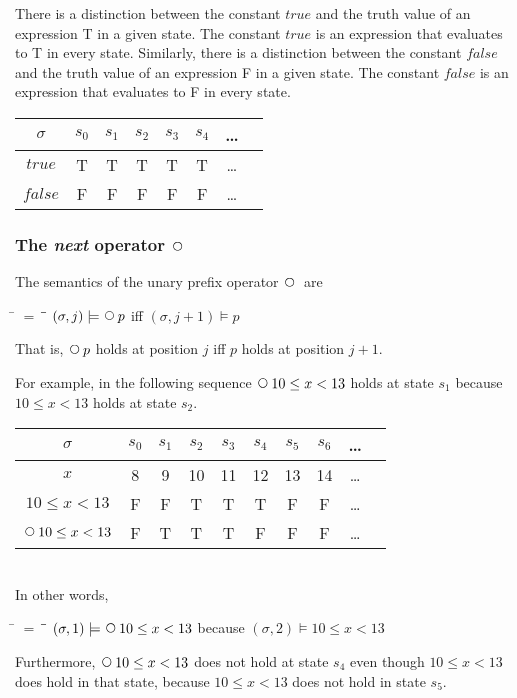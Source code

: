 \documentclass[12pt, fleqn, leqno]{article}
\newcommand{\lllgap}{12pt}                          %
\newcommand{\mymathindent}{24pt}                    %
\newcommand{\Next}{\;\,\text{\raisebox{3.5pt}{\circle{6}}}}
\newcommand{\myqedtab}{\hspace{384pt}}              %
\begin{document}
There is a distinction between the constant $true$ and the truth value of an expression T in a given state.
The constant $true$ is an expression that evaluates to T in every state.
Similarly, there is a distinction between the constant $false$ and the truth value of an expression F in a given state.
The constant $false$ is an expression that evaluates to F in every state.\\[\lllgap]
\begin{tabular}{c|ccccccc}
  $\sigma$      & $s_0$ & $s_1$ & $s_2$ & $s_3$ & $s_4$ & \dots \\
  \hline
  $true$        & T     & T     & T     & T     & T     & \dots\\
  $false$       & F     & F     & F     & F     & F     & \dots
\end{tabular}

\subsubsection*{The \textit{next} operator $\Next$}

The semantics of the unary prefix operator $\Next$ are
\begin{tabbing}
\hspace{\mymathindent} \= $= \;$ \= \myqedtab \= \kill
  \> $(\sigma, j) \models \Next p$ \quad iff \quad $(\sigma, j+1) \models p$
\end{tabbing}
That is, $\Next p$ holds at position $j$ iff $p$ holds at position $j+1$.

For example, in the following sequence $\Next 10\le x< 13$ holds at state $s_1$ because $10\le x< 13$ holds at state $s_2$.\\[\lllgap]
\begin{tabular}{c|ccccccccc}
  $\sigma$             & $s_0$ & $s_1$ & $s_2$ & $s_3$ & $s_4$ & $s_5$ & $s_6$ & \dots \\
  \hline
  $x$                  & 8     & 9     & 10    & 11    & 12    & 13    & 14    & \dots\\
  $10\le x< 13$        & F     & F     & T     & T     & T     & F     & F     & \dots\\
  $\Next 10\le x< 13$  & F     & T     & T     & T     & F     & F     & F     & \dots
\end{tabular}\\[\lllgap]
In other words,
\begin{tabbing}
\hspace{\mymathindent} \= $= \;$ \= \myqedtab \= \kill
  \> $(\sigma, 1) \models \Next 10\le x< 13$ \quad because \quad $(\sigma, 2) \models 10\le x< 13$
\end{tabbing}
Furthermore, $\Next 10\le x< 13$ does not hold at state $s_4$ even though $10\le x< 13$ does hold in that state, because $10\le x< 13$ does not hold in state $s_5$.
\end{document}
